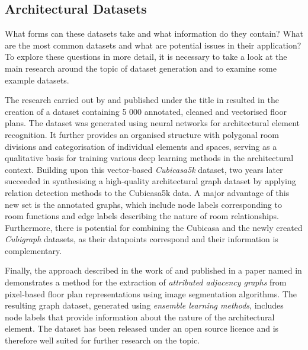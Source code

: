 \documentclass[a4paper, 12pt]{report}
\begin{document}
\subsection{Architectural Datasets}\label{subsec:architectural-datasets}

What forms can these datasets take and what information do they contain? What are the most common datasets and what are potential issues in their application? To explore these questions in more detail, it is necessary to take a look at the main research around the topic of dataset generation and to examine some example datasets.

The research carried out by \citeauthor{kalervo2019cubicasa5k} and published under the title  in \citeyear{kalervo2019cubicasa5k} resulted in the creation of a dataset containing 5 000 annotated, cleaned and vectorised floor plans. The dataset was generated using neural networks for architectural element recognition. It further provides an organised structure with polygonal room divisions and categorisation of individual elements and spaces, serving as a qualitative basis for training various deep learning methods in the architectural context. Building upon this vector-based \textit{Cubicasa5k} dataset, two years later \citeauthor{lu2021organizational} succeeded in synthesising a high-quality architectural graph dataset by applying relation detection methods to the Cubicasa5k data. A major advantage of this new set is the annotated graphs, which include node labels corresponding to room functions and edge labels describing the nature of room relationships. Furthermore, there is potential for combining the Cubicasa and the newly created \textit{Cubigraph} datasets, as their datapoints correspond and their information is complementary.

Finally, the approach described in the work of \citeauthor{chen2022ro} and published in a paper named  in \citeyear{chen2022ro} demonstrates a method for the extraction of \textit{attributed adjacency graphs} from pixel-based floor plan representations using image segmentation algorithms. The resulting graph dataset, generated using \textit{\glspl{ensemble learning method}}, includes node labels that provide information about the nature of the architectural element. The dataset has been released under an \gls{open source} licence and is therefore well suited for further research on the topic.
\end{document}
